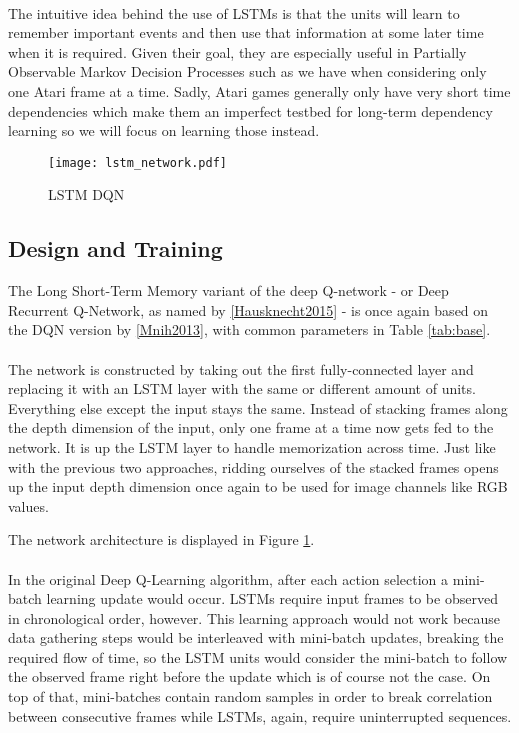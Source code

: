 \paragraph{}
The intuitive idea behind the use of LSTMs
is that the units will learn to remember important events
and then use that information at some later time
when it is required.
Given their goal,
they are especially useful in Partially Observable Markov Decision Processes
such as we have when considering only one Atari frame at a time.
Sadly, Atari games generally only have very short time dependencies
which make them an imperfect testbed for
long-term dependency learning
so we will focus on learning those instead.

\begin{figure}[htpb]
  \centering
  \texttt{[image: lstm\_network.pdf]}
  \caption{LSTM DQN}
  \label{fig:lstm_network}
\end{figure}

\subsection{Design and Training}
\label{sub:lstm_design_and_training}
The Long Short-Term Memory variant
of the deep Q-network
- or Deep Recurrent Q-Network,
as named by \ref{Hausknecht2015} -
is once again based on the DQN version
by \ref{Mnih2013},
with common parameters in Table \ref{tab:base}.

\paragraph{}
The network is constructed by taking out
the first fully-connected layer
and replacing it with an LSTM layer
with the same or different amount of units.
Everything else except the input stays the same.
Instead of stacking frames along the depth dimension of the input,
only one frame at a time now gets fed to the network.
It is up the LSTM layer to handle memorization across time.
Just like with the previous two approaches,
ridding ourselves of the stacked frames opens up the input depth dimension
once again
to be used for image channels like RGB values.

The network architecture is displayed in Figure \ref{fig:lstm_network}.

\paragraph{}
In the original Deep Q-Learning algorithm,
after each action selection
a mini-batch learning update would occur.
LSTMs require input frames to be observed in chronological order, however.
This learning approach would not work
because data gathering steps would be interleaved with mini-batch updates,
breaking the required flow of time,
so the LSTM units
would consider the mini-batch to follow the observed frame right before the update
which is of course not the case.
On top of that, mini-batches contain random samples
in order to break correlation
between consecutive frames
while LSTMs, again, require uninterrupted sequences.

